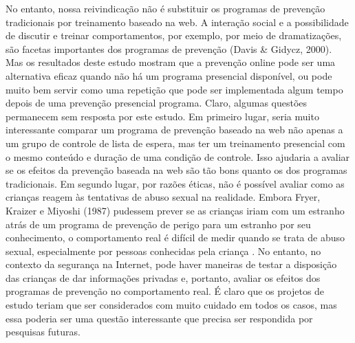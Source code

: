No entanto, nossa reivindicação não é substituir os programas de prevenção tradicionais por treinamento baseado na web. A interação social e a possibilidade de discutir e treinar comportamentos, por exemplo, por meio de dramatizações, são facetas importantes dos programas de prevenção (Davis \& Gidycz, 2000). Mas os resultados deste estudo mostram que a prevenção online pode ser uma alternativa eficaz quando não há um programa presencial disponível, ou pode muito bem servir como uma repetição que pode ser implementada algum tempo depois de uma prevenção presencial programa. Claro, algumas questões permanecem sem resposta por este estudo. Em primeiro lugar, seria muito interessante comparar um programa de prevenção baseado na web não apenas a um grupo de controle de lista de espera, mas ter um treinamento presencial com o mesmo conteúdo e duração de uma condição de controle. Isso ajudaria a avaliar se os efeitos da prevenção baseada na web são tão bons quanto os dos programas tradicionais. Em segundo lugar, por razões éticas, não é possível avaliar como as crianças reagem às tentativas de abuso sexual na realidade. Embora Fryer, Kraizer e Miyoshi (1987) pudessem prever se as crianças iriam com um estranho atrás de um programa de prevenção de perigo para um estranho por seu conhecimento, o comportamento real é difícil de medir quando se trata de abuso sexual, especialmente por pessoas conhecidas pela criança . No entanto, no contexto da segurança na Internet, pode haver maneiras de testar a disposição das crianças de dar informações privadas e, portanto, avaliar os efeitos dos programas de prevenção no comportamento real. É claro que os projetos de estudo teriam que ser considerados com muito cuidado em todos os casos, mas essa poderia ser uma questão interessante que precisa ser respondida por pesquisas futuras. \cite{muller2014child}


